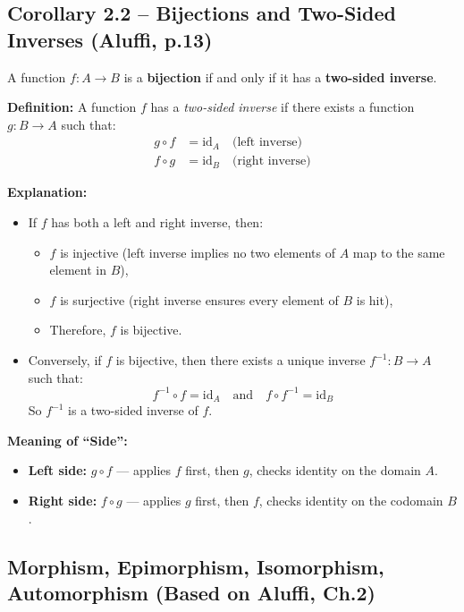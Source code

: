 \documentclass[10pt]{article}
\theoremstyle{plain}
\theoremstyle{definition}
\begin{document}
\subsection*{Corollary 2.2 – Bijections and Two-Sided Inverses (Aluffi, p.13)}

A function \( f: A \to B \) is a \textbf{bijection} if and only if it has a \textbf{two-sided inverse}.

\medskip

\textbf{Definition:} A function \( f \) has a \emph{two-sided inverse} if there exists a function \( g: B \to A \) such that:
\begin{align*}
	g \circ f &= \mathrm{id}_A \quad \text{(left inverse)} \\
	f \circ g &= \mathrm{id}_B \quad \text{(right inverse)}
\end{align*}

\medskip

\textbf{Explanation:}
\begin{itemize}
	\item If \( f \) has both a left and right inverse, then:
	\begin{itemize}
		\item \( f \) is injective (left inverse implies no two elements of \( A \) map to the same element in \( B \)),
		\item \( f \) is surjective (right inverse ensures every element of \( B \) is hit),
		\item Therefore, \( f \) is bijective.
	\end{itemize}
	\item Conversely, if \( f \) is bijective, then there exists a unique inverse \( f^{-1}: B \to A \) such that:
	\[
	f^{-1} \circ f = \mathrm{id}_A \quad \text{and} \quad f \circ f^{-1} = \mathrm{id}_B
	\]
	So \( f^{-1} \) is a two-sided inverse of \( f \).
\end{itemize}

\medskip

\textbf{Meaning of “Side”:}
\begin{itemize}
	\item \textbf{Left side:} \( g \circ f \) — applies \( f \) first, then \( g \), checks identity on the domain \( A \).
	\item \textbf{Right side:} \( f \circ g \) — applies \( g \) first, then \( f \), checks identity on the codomain \( B \).
\end{itemize}



\subsection*{Morphism, Epimorphism, Isomorphism, Automorphism (Based on Aluffi, Ch.2)}
\end{document}
